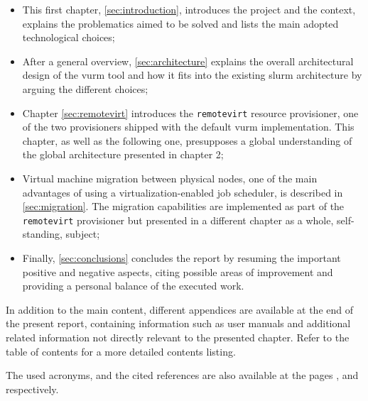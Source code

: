 \begin{itemize}
	\item This first chapter, \autoref{sec:introduction}, introduces the project and the context, explains the problematics aimed to be solved and lists the main adopted technological choices;
	\item After a general overview, \autoref{sec:architecture} explains the overall architectural design of the \gls{vurm} tool and how it fits into the existing \gls{slurm} architecture by arguing the different choices;
	\item Chapter \ref{sec:remotevirt} introduces the \texttt{remotevirt} resource provisioner, one of the two provisioners shipped with the default \gls{vurm} implementation. This chapter, as well as the following one, presupposes a global understanding of the global architecture presented in chapter 2;
	\item Virtual machine migration between physical nodes, one of the main advantages of using a virtualization-enabled job scheduler, is described in \autoref{sec:migration}. The migration capabilities are implemented as part of the \texttt{remotevirt} provisioner but presented in a different chapter as a whole, self-standing, subject;
	\item Finally, \autoref{sec:conclusions} concludes the report by resuming the important positive and negative aspects, citing possible areas of improvement and providing a personal balance of the executed work.
\end{itemize}

In addition to the main content, different appendices are available at the end of the present report, containing information such as user manuals and additional related information not directly relevant to the presented chapter. Refer to the table of contents for a more detailed contents listing.

The used acronyms, and the cited references are also available at the pages \pageref{sec:acronyms}, and \pageref{sec:references} respectively.
